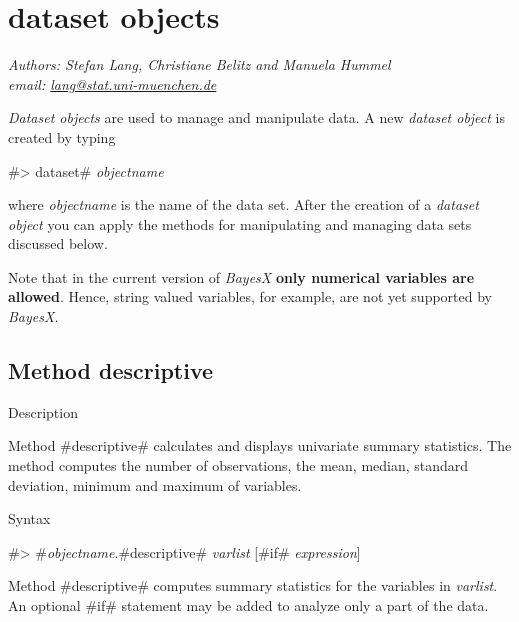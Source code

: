 \chapter{dataset objects} \label{chap_data}
\label{datasetobj}  

{\em Authors: Stefan Lang, Christiane Belitz and Manuela Hummel}   \\
{\em email: \href{mailto:lang@stat.uni-muenchen.de}{lang@stat.uni-muenchen.de}}\\
\vspace{0.3cm}


{\em Dataset objects} are used to manage and manipulate data. A new {\em dataset object} is created by typing

#> dataset# {\em objectname}

where {\em objectname} is the name of the data set. After the
creation of a {\em dataset object} you can apply the methods for
manipulating and managing data sets discussed below.

Note that in the current version of {\em BayesX} {\bf only
numerical variables are allowed}. Hence, string valued variables,
for example,  are not yet supported by {\em BayesX}.



\clearpage



\section{Method descriptive}
\label{descriptive} 
 



\begin{stanza}{Description}

{Method #descriptive# calculates and displays univariate summary
statistics. The method computes the number of observations, the
mean, median, standard deviation, minimum and maximum of
variables.}
\end{stanza}



\begin{stanza}{Syntax}

{#> #{\em objectname}.#descriptive# {\em varlist} [#if# {\em expression}]

Method #descriptive# computes summary statistics for the variables
in {\em varlist}. An optional #if# statement may be added to
analyze only a part of the data.}
\end{stanza}


